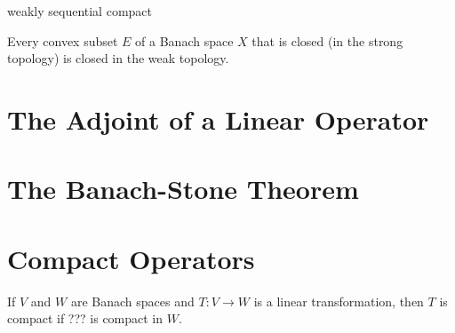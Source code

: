 weakly sequential compact

\begin{theorem}
    Every convex subset $E$ of a Banach space $X$ that is closed (in the strong topology) is closed in the weak topology.
\end{theorem}

\section{The Adjoint of a Linear Operator}


\section{The Banach-Stone Theorem}



\section{Compact Operators}
\begin{definition}
    If $V$ and $W$ are Banach spaces and $T:V\to W$ is a linear transformation,
    then $T$ is compact if ??? is compact in $W$.
\end{definition}
